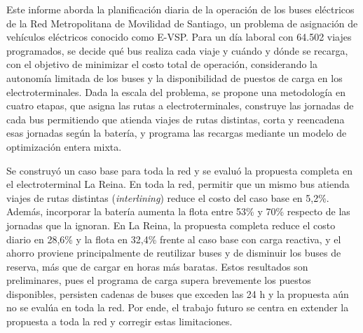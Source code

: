 Este informe aborda la planificación diaria de la operación de los buses eléctricos de la Red Metropolitana de Movilidad de Santiago, un problema de asignación de vehículos eléctricos conocido como E-VSP. Para un día laboral con 64.502 viajes programados, se decide qué bus realiza cada viaje y cuándo y dónde se recarga, con el objetivo de minimizar el costo total de operación, considerando la autonomía limitada de los buses y la disponibilidad de puestos de carga en los electroterminales. Dada la escala del problema, se propone una metodología en cuatro etapas, que asigna las rutas a electroterminales, construye las jornadas de cada bus permitiendo que atienda viajes de rutas distintas, corta y reencadena esas jornadas según la batería, y programa las recargas mediante un modelo de optimización entera mixta.

Se construyó un caso base para toda la red y se evaluó la propuesta completa en el electroterminal La Reina. En toda la red, permitir que un mismo bus atienda viajes de rutas distintas (\textit{interlining}) reduce el costo del caso base en 5,2\%. Además, incorporar la batería aumenta la flota entre 53\% y 70\% respecto de las jornadas que la ignoran. En La Reina, la propuesta completa reduce el costo diario en 28,6\% y la flota en 32,4\% frente al caso base con carga reactiva, y el ahorro proviene principalmente de reutilizar buses y de disminuir los buses de reserva, más que de cargar en horas más baratas. Estos resultados son preliminares, pues el programa de carga supera brevemente los puestos disponibles, persisten cadenas de buses que exceden las 24 h y la propuesta aún no se evalúa en toda la red. Por ende, el trabajo futuro se centra en extender la propuesta a toda la red y corregir estas limitaciones.
